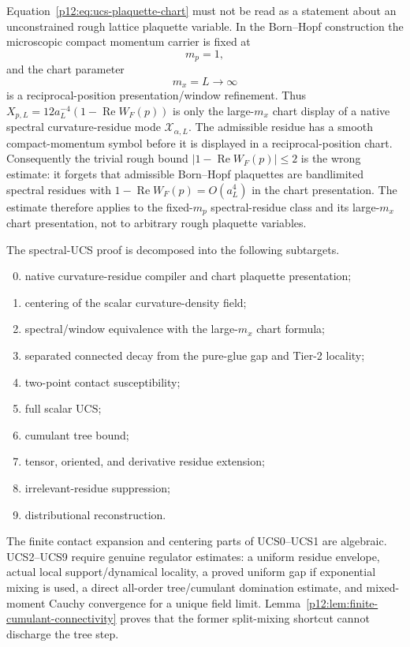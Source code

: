 \documentclass[12pt,a4paper]{article}
\begin{document}
\begin{remark}
\label{p12:rem:ucs-mp-mx-distinction}
Equation~\eqref{p12:eq:ucs-plaquette-chart} must not be read as a statement about an unconstrained rough lattice plaquette variable.  In the Born--Hopf construction the microscopic compact momentum carrier is fixed at
\[
 m_p=1,
\]
and the chart parameter
\[
 m_x=L\to\infty
\]
is a reciprocal-position presentation/window refinement.  Thus \(X_{p,L}=12a_L^{-4}(1-\operatorname{Re}W_F(p))\) is only the large-\(m_x\) chart display of a native spectral curvature-residue mode \(\mathcal X_{\alpha,L}\).  The admissible residue has a smooth compact-momentum symbol before it is displayed in a reciprocal-position chart.  Consequently the trivial rough bound \(|1-\operatorname{Re}W_F(p)|\le2\) is the wrong estimate: it forgets that admissible Born--Hopf plaquettes are bandlimited spectral residues with \(1-\operatorname{Re}W_F(p)=O(a_L^4)\) in the chart presentation.  The estimate therefore applies to the fixed-\(m_p\) spectral-residue class and its large-\(m_x\) chart presentation, not to arbitrary rough plaquette variables.
\end{remark}

\begin{definition}
\label{p12:def:ucs-subladder}
The spectral-UCS proof is decomposed into the following subtargets.
\begin{enumerate}[label=\textnormal{(UCS\arabic*)}, leftmargin=5.2em]
\setcounter{enumi}{-1}
\item native curvature-residue compiler and chart plaquette presentation;
\item centering of the scalar curvature-density field;
\item spectral/window equivalence with the large-\(m_x\) chart formula;
\item separated connected decay from the pure-glue gap and Tier-2 locality;
\item two-point contact susceptibility;
\item full scalar UCS;
\item cumulant tree bound;
\item tensor, oriented, and derivative residue extension;
\item irrelevant-residue suppression;
\item distributional reconstruction.
\end{enumerate}
The finite contact expansion and centering parts of UCS0--UCS1 are algebraic.  UCS2--UCS9 require genuine regulator estimates: a uniform residue envelope, actual local support/dynamical locality, a proved uniform gap if exponential mixing is used, a direct all-order tree/cumulant domination estimate, and mixed-moment Cauchy convergence for a unique field limit.  Lemma~\ref{p12:lem:finite-cumulant-connectivity} proves that the former split-mixing shortcut cannot discharge the tree step.
\end{definition}
\end{document}
